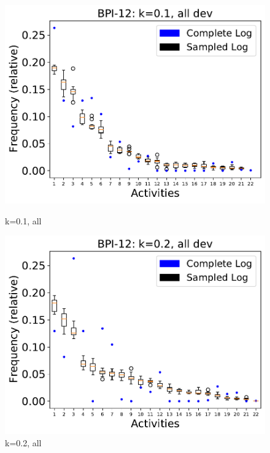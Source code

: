 \documentclass[landscape]{article}
\begin{document}
\begin{figure}[!htb]
	\centering
	\begin{minipage}{0.2\textwidth}
		\includegraphics[width=1.0\textwidth]{../BPI_Challenge_2012/BPI_Challenge_2012_deviationsApprox_0.1_NONALIGNING_ALL.pdf}
		\caption{k=0.1, all}
	\end{minipage}
	\hfill
	\begin{minipage}{0.2\textwidth}
		\includegraphics[width=1.0\textwidth]{../BPI_Challenge_2012/BPI_Challenge_2012_deviationsApprox_0.2_NONALIGNING_ALL.pdf}
		\caption{k=0.2, all}
	\end{minipage}
	\hfill
	\begin{minipage}{0.2\textwidth}

\end{minipage}
\end{figure}
\end{document}
